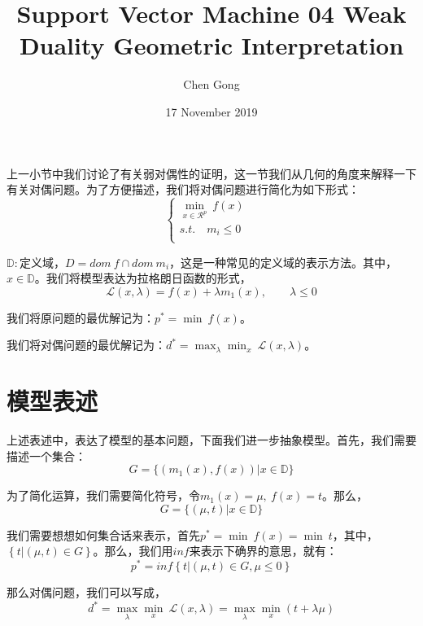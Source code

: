 \documentclass[a4paper]{article}
\title{Support Vector Machine 04 Weak Duality Geometric Interpretation}
\author{Chen Gong}
\date{17 November 2019}
\begin{document}
\maketitle
上一小节中我们讨论了有关弱对偶性的证明，这一节我们从几何的角度来解释一下有关对偶问题。为了方便描述，我们将对偶问题进行简化为如下形式：
\begin{equation}
    \left\{
    \begin{array}{ll}
        \min_{x\in \mathcal{R}^p} \ f(x) & \\
        s.t. \quad m_i \leq 0 & \\
    \end{array}
    \right.
\end{equation}

$\mathbb{D}:$定义域，$D=dom\ f \cap dom\ m_i$，这是一种常见的定义域的表示方法。其中，$x\in \mathbb{D}$。我们将模型表达为拉格朗日函数的形式，
\begin{equation}
    \mathcal{L}(x,\lambda) = f(x) + \lambda m_1(x),\qquad \lambda \leq 0
\end{equation}

我们将原问题的最优解记为：$p^\ast = \min\ f(x)$。

我们将对偶问题的最优解记为：$d^\ast = \max_{\lambda} \min_{x} \ \mathcal{L}(x,\lambda)$。

\section{模型表述}
上述表述中，表达了模型的基本问题，下面我们进一步抽象模型。首先，我们需要描述一个集合：
\begin{equation}
    G = \{ (m_1(x),f(x))|x \in \mathbb{D} \}
\end{equation}

为了简化运算，我们需要简化符号，令$m_1(x) = \mu,\ f(x)=t$。那么，
\begin{equation}
    G = \{ (\mu,t)|x \in \mathbb{D} \}
\end{equation}

我们需要想想如何集合话来表示，首先$p^\ast = \min \ f(x) = \min \ t$，其中，$\left\{ t|(\mu,t)\in G \right\}$。那么，我们用$inf$来表示下确界的意思，就有：
\begin{equation}
    p^\ast = inf\left\{ t|(\mu,t)\in G,\mu \leq 0 \right\}
\end{equation}

那么对偶问题，我们可以写成，
\begin{equation}
    d^\ast = \max_{\lambda}\min_{x} \ \mathcal{L}(x,\lambda)=\max_{\lambda}\min_{x} (t+\lambda \mu)
\end{equation}
\end{document}
